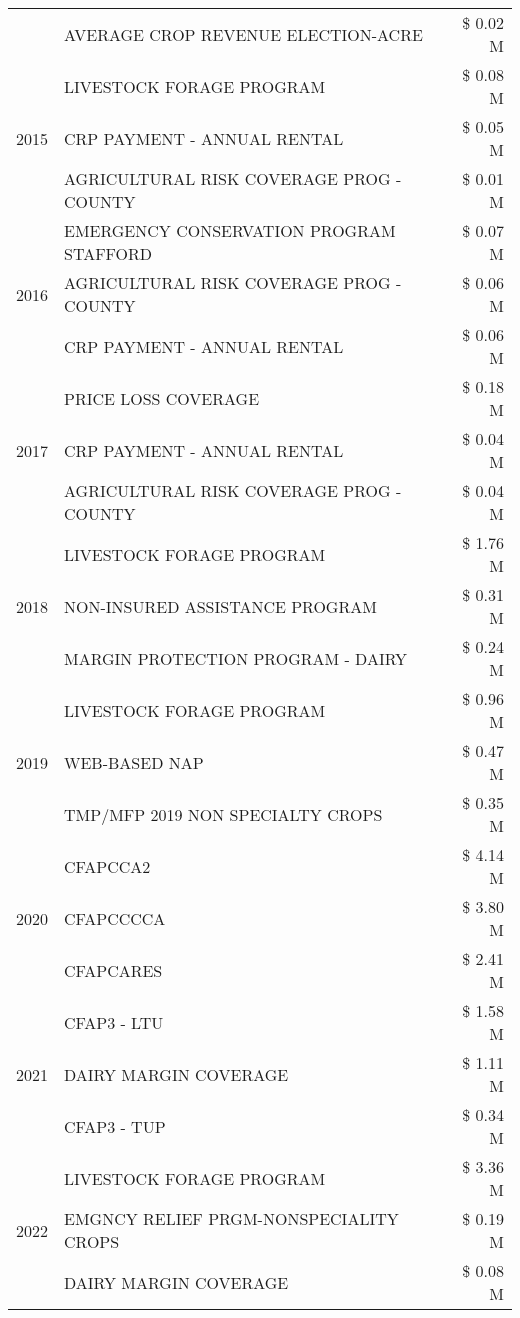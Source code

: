 \begin{tabular}{llr}
 & AVERAGE CROP REVENUE ELECTION-ACRE & \$ 0.02 M \\
\cline{1-3}
\multirow[t]{3}{*}{2015} & LIVESTOCK FORAGE PROGRAM & \$ 0.08 M \\
 & CRP PAYMENT - ANNUAL RENTAL & \$ 0.05 M \\
 & AGRICULTURAL RISK COVERAGE PROG - COUNTY & \$ 0.01 M \\
\cline{1-3}
\multirow[t]{3}{*}{2016} & EMERGENCY CONSERVATION PROGRAM STAFFORD & \$ 0.07 M \\
 & AGRICULTURAL RISK COVERAGE PROG - COUNTY & \$ 0.06 M \\
 & CRP PAYMENT - ANNUAL RENTAL & \$ 0.06 M \\
\cline{1-3}
\multirow[t]{3}{*}{2017} & PRICE LOSS COVERAGE & \$ 0.18 M \\
 & CRP PAYMENT - ANNUAL RENTAL & \$ 0.04 M \\
 & AGRICULTURAL RISK COVERAGE PROG - COUNTY & \$ 0.04 M \\
\cline{1-3}
\multirow[t]{3}{*}{2018} & LIVESTOCK FORAGE PROGRAM & \$ 1.76 M \\
 & NON-INSURED ASSISTANCE PROGRAM & \$ 0.31 M \\
 & MARGIN PROTECTION PROGRAM - DAIRY & \$ 0.24 M \\
\cline{1-3}
\multirow[t]{3}{*}{2019} & LIVESTOCK FORAGE PROGRAM & \$ 0.96 M \\
 & WEB-BASED NAP & \$ 0.47 M \\
 & TMP/MFP 2019 NON SPECIALTY CROPS & \$ 0.35 M \\
\cline{1-3}
\multirow[t]{3}{*}{2020} & CFAPCCA2 & \$ 4.14 M \\
 & CFAPCCCCA & \$ 3.80 M \\
 & CFAPCARES & \$ 2.41 M \\
\cline{1-3}
\multirow[t]{3}{*}{2021} & CFAP3 - LTU & \$ 1.58 M \\
 & DAIRY MARGIN COVERAGE & \$ 1.11 M \\
 & CFAP3 - TUP & \$ 0.34 M \\
\cline{1-3}
\multirow[t]{3}{*}{2022} & LIVESTOCK FORAGE PROGRAM & \$ 3.36 M \\
 & EMGNCY RELIEF PRGM-NONSPECIALITY CROPS & \$ 0.19 M \\
 & DAIRY MARGIN COVERAGE & \$ 0.08 M \\
\cline{1-3}
\bottomrule
\end{tabular}
